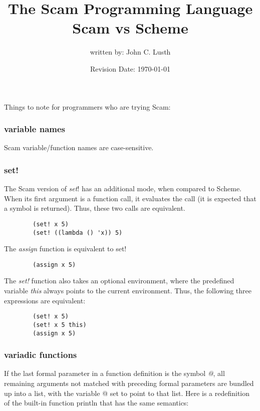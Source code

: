 \documentclass{article}
\title{The Scam Programming Language\\
Scam vs Scheme}
\author{written by: John C. Lusth}
\date{Revision Date: \today}
\begin{document}
\maketitle

\W{}

Things to note for programmers who are trying Scam:

\subsubsection*{variable names}

    Scam variable/function names are case-sensitive.

\subsubsection*{set!}

    The Scam version of {\it set}! has an additional mode, when compared to
    Scheme. When its first argument is a function call, it evaluates the
    call (it is expected that a symbol is returned).
    Thus, these two calls are equivalent. 
    
\begin{verbatim}
        (set! x 5)
        (set! ((lambda () 'x)) 5)
\end{verbatim}

    The {\it assign} function is equivalent to set!

\begin{verbatim}
        (assign x 5)
\end{verbatim}

    The {\it set!} function also takes an optional environment,
    where the predefined
    variable {\it this} always points to the current environment.
    Thus, the following
    three expressions are equivalent:

\begin{verbatim}
        (set! x 5)
        (set! x 5 this)
        (assign x 5)
\end{verbatim}

\subsubsection*{variadic functions}

    If the last formal parameter in a function definition is the
    symbol {\it @}, all remaining arguments not matched with 
    preceding formal parameters are bundled up into a list, with
    the variable @ set to point to that list. Here is a redefinition
    of the built-in function println that has the same semantics:
\end{document}
